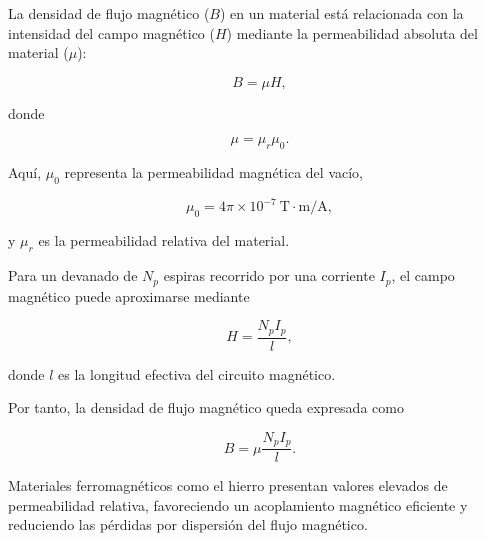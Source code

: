 La densidad de flujo magnético ($B$) en un material está relacionada con la intensidad del campo magnético ($H$) mediante la permeabilidad absoluta del material ($\mu$):

\begin{equation}
B=\mu H,
\end{equation}

donde

\begin{equation}
\mu=\mu_r\mu_0.
\end{equation}

Aquí, $\mu_0$ representa la permeabilidad magnética del vacío,

\begin{equation}
\mu_0 = 4\pi \times 10^{-7}\ \mathrm{T\cdot m/A},
\end{equation}

y $\mu_r$ es la permeabilidad relativa del material.

Para un devanado de $N_p$ espiras recorrido por una corriente $I_p$, el campo magnético puede aproximarse mediante

\begin{equation}
H=\frac{N_p I_p}{l},
\end{equation}

donde $l$ es la longitud efectiva del circuito magnético.

Por tanto, la densidad de flujo magnético queda expresada como

\begin{equation}
B=\mu\frac{N_p I_p}{l}.
\end{equation}

Materiales ferromagnéticos como el hierro presentan valores elevados de permeabilidad relativa, favoreciendo un acoplamiento magnético eficiente y reduciendo las pérdidas por dispersión del flujo magnético.
